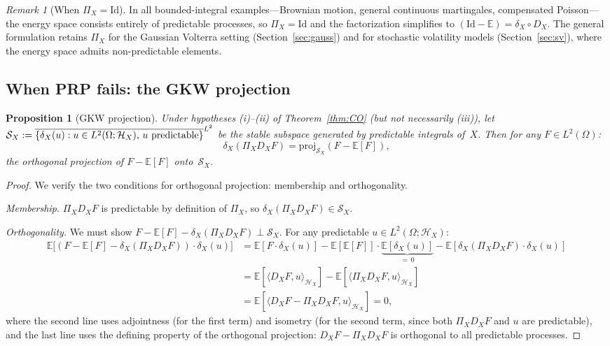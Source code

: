 \documentclass[11pt,a4paper]{article}
\theoremstyle{plain}
\newtheorem{proposition}[theorem]{Proposition}
\theoremstyle{definition}
\theoremstyle{remark}
\newtheorem{remark}[theorem]{Remark}
\newcommand{\E}{\mathbb{E}}
\newcommand{\Id}{\mathrm{Id}}
\newcommand{\HX}{\mathcal{H}_X}
\begin{document}
\begin{remark}[When $\Pi_X = \Id$]\label{rem:Pi_trivial}
In all bounded-integral examples---Brownian motion, general continuous martingales, compensated Poisson---the energy space consists entirely of predictable processes, so $\Pi_X = \Id$ and the factorization simplifies to $(\Id - \E) = \delta_X \circ D_X$. The general formulation retains $\Pi_X$ for the Gaussian Volterra setting (Section~\ref{sec:gauss}) and for stochastic volatility models (Section~\ref{sec:sv}), where the energy space admits non-predictable elements.
\end{remark}


\subsection{When PRP fails: the GKW projection}

\begin{proposition}[GKW projection]\label{prop:GKW}
Under hypotheses (i)--(ii) of Theorem~\ref{thm:CO} (but not necessarily (iii)), let $\mathcal{S}_X := \overline{\{\delta_X(u) : u \in L^2(\Omega;\HX),\, u \textup{ predictable}\}}^{L^2}$ be the stable subspace generated by predictable integrals of~$X$. Then for any $F \in L^2(\Omega)$:
\[
\delta_X(\Pi_X D_X F) = \mathrm{proj}_{\mathcal{S}_X}(F - \E[F]),
\]
the orthogonal projection of $F - \E[F]$ onto~$\mathcal{S}_X$.
\end{proposition}

\begin{proof}
We verify the two conditions for orthogonal projection: membership and orthogonality.

\emph{Membership.} $\Pi_X D_X F$ is predictable by definition of $\Pi_X$, so $\delta_X(\Pi_X D_X F) \in \mathcal{S}_X$.

\emph{Orthogonality.} We must show $F - \E[F] - \delta_X(\Pi_X D_X F) \perp \mathcal{S}_X$. For any predictable $u \in L^2(\Omega; \HX)$:
\begin{align*}
\E\bigl[(F - \E[F] - \delta_X(\Pi_X D_X F)) \cdot \delta_X(u)\bigr]
&= \E[F \cdot \delta_X(u)] - \E[\E[F]] \cdot \underbrace{\E[\delta_X(u)]}_{=\,0} - \E[\delta_X(\Pi_X D_X F) \cdot \delta_X(u)] \\
&= \E[\langle D_X F, u \rangle_{\HX}] - \E[\langle \Pi_X D_X F, u \rangle_{\HX}] \\
&= \E[\langle D_X F - \Pi_X D_X F, u \rangle_{\HX}] = 0,
\end{align*}
where the second line uses adjointness (for the first term) and isometry (for the second term, since both $\Pi_X D_X F$ and $u$ are predictable), and the last line uses the defining property of the orthogonal projection: $D_X F - \Pi_X D_X F$ is orthogonal to all predictable processes.
\end{proof}
\end{document}
